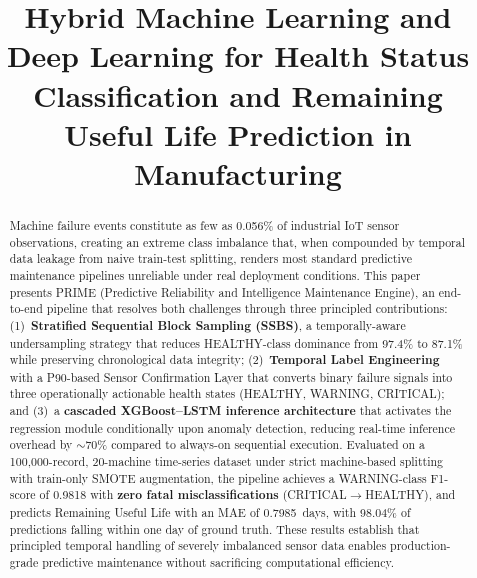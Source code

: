 \documentclass[conference]{IEEEtran}
\begin{document}
\title{Hybrid Machine Learning and Deep Learning for Health Status
       Classification and Remaining Useful Life Prediction in Manufacturing}

\author{
}

\maketitle

\begin{abstract}
Machine failure events constitute as few as 0.056\% of industrial
IoT sensor observations, creating an extreme class imbalance that,
when compounded by temporal data leakage from naive train-test
splitting, renders most standard predictive maintenance pipelines
unreliable under real deployment conditions. This paper presents
PRIME (Predictive Reliability and Intelligence Maintenance Engine),
an end-to-end pipeline that resolves both challenges through three
principled contributions: (1)~\textbf{Stratified Sequential Block
Sampling (SSBS)}, a temporally-aware undersampling strategy that
reduces HEALTHY-class dominance from 97.4\% to 87.1\% while
preserving chronological data integrity; (2)~\textbf{Temporal Label
Engineering} with a P90-based Sensor Confirmation Layer that
converts binary failure signals into three operationally actionable
health states (HEALTHY, WARNING, CRITICAL); and (3)~a
\textbf{cascaded XGBoost--LSTM inference architecture} that
activates the regression module conditionally upon anomaly
detection, reducing real-time inference overhead by
$\sim$70\% compared to always-on sequential execution. Evaluated
on a 100,000-record, 20-machine time-series dataset under strict
machine-based splitting with train-only SMOTE augmentation, the
pipeline achieves a WARNING-class F1-score of 0.9818 with
\textbf{zero fatal misclassifications} (CRITICAL$\rightarrow$HEALTHY),
and predicts Remaining Useful Life with an MAE of 0.7985~days,
with 98.04\% of predictions falling within one day of ground truth.
These results establish that principled temporal handling of
severely imbalanced sensor data enables production-grade predictive
maintenance without sacrificing computational efficiency.
\end{abstract}
\end{document}
